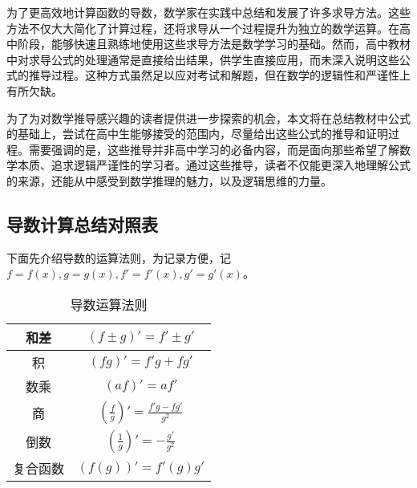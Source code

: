 
\begin{issues}
\issueDraft
\end{issues}


为了更高效地计算函数的导数，数学家在实践中总结和发展了许多求导方法。这些方法不仅大大简化了计算过程，还将求导从一个过程提升为独立的数学运算。在高中阶段，能够快速且熟练地使用这些求导方法是数学学习的基础。然而，高中教材中对求导公式的处理通常是直接给出结果，供学生直接应用，而未深入说明这些公式的推导过程。这种方式虽然足以应对考试和解题，但在数学的逻辑性和严谨性上有所欠缺。

为了为对数学推导感兴趣的读者提供进一步探索的机会，本文将在总结教材中公式的基础上，尝试在高中生能够接受的范围内，尽量给出这些公式的推导和证明过程。需要强调的是，这些推导并非高中学习的必备内容，而是面向那些希望了解数学本质、追求逻辑严谨性的学习者。通过这些推导，读者不仅能更深入地理解公式的来源，还能从中感受到数学推理的魅力，以及逻辑思维的力量。

\subsection{导数计算总结对照表}

下面先介绍导数的运算法则，为记录方便，记$f=f(x),g=g(x),f'=f'(x),g'=g'(x)$。
\begin{table}[ht]
\centering
\caption{导数运算法则}\label{tab_HsDerB1}
\begin{tabular}{|c|c|}
\hline
和差 & $(f\pm g)'=f'\pm g'$ \\
\hline
积 & $(fg)'=f'g+fg'$ \\
\hline
数乘 & $(af)'=af'$ \\
\hline
商 & $\displaystyle\left(\frac{f}{g}\right)'=\frac{f'g-fg'}{g^2}$ \\
\hline
倒数 & $\displaystyle\left(\frac{1}{g}\right)'=-\frac{g'}{g^2}$ \\
\hline
复合函数 & $(f(g))'=f'(g)g'$ \\
\hline
\end{tabular}
\end{table}

